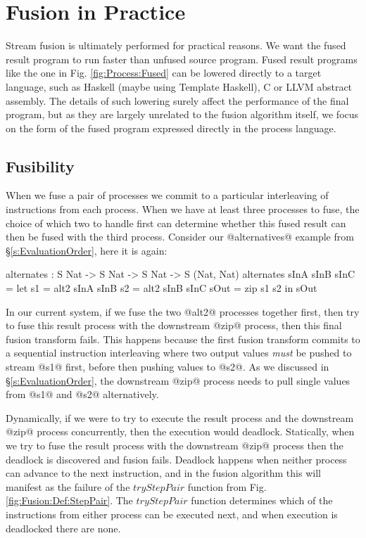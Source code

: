 
\eject{}
\section{Fusion in Practice}
\label{s:Evaluation}

Stream fusion is ultimately performed for practical reasons. We want the fused result program to run faster than unfused source program. Fused result programs like the one in Fig. \ref{fig:Process:Fused} can be lowered directly to a target language, such as Haskell (maybe using Template Haskell), C or LLVM abstract assembly. The details of such lowering surely affect the performance of the final program, but as they are largely unrelated to the fusion algorithm itself, we focus on the form of the fused program expressed directly in the process language.


\subsection{Fusibility}
\label{s:FusionOrder}
When we fuse a pair of processes we commit to a particular interleaving of instructions from each process. When we have at least three processes to fuse, the choice of which two to handle first can determine whether this fused result can then be fused with the third process. Consider our @alternatives@ example from \S\ref{s:EvaluationOrder}, here it is again:
\begin{code}
  alternates : S Nat -> S Nat -> S Nat -> S (Nat, Nat)
  alternates sInA sInB sInC
   = let  s1   = alt2 sInA sInB
          s2   = alt2 sInB sInC
          sOut = zip s1 s2
     in   sOut
\end{code}

In our current system, if we fuse the two @alt2@ processes together first, then try to fuse this result process with the downstream @zip@ process, then this final fusion transform fails. This happens because the first fusion transform commits to a sequential instruction interleaving where two output values \emph{must} be pushed to stream @s1@ first, before then pushing values to @s2@. As we discussed in \S\ref{s:EvaluationOrder}, the downstream @zip@ process needs to pull single values from @s1@ and @s2@ alternatively.

Dynamically, if we were to try to execute the result process and the downstream @zip@ process concurrently, then the execution would deadlock. Statically, when we try to fuse the result process with the downstream @zip@ process then the deadlock is discovered and fusion fails. Deadlock happens when neither process can advance to the next instruction, and in the fusion algorithm this will manifest as the failure of the $tryStepPair$ function from Fig.\ref{fig:Fusion:Def:StepPair}. The $tryStepPair$ function determines which of the instructions from either process can be executed next, and when execution is deadlocked there are none.

